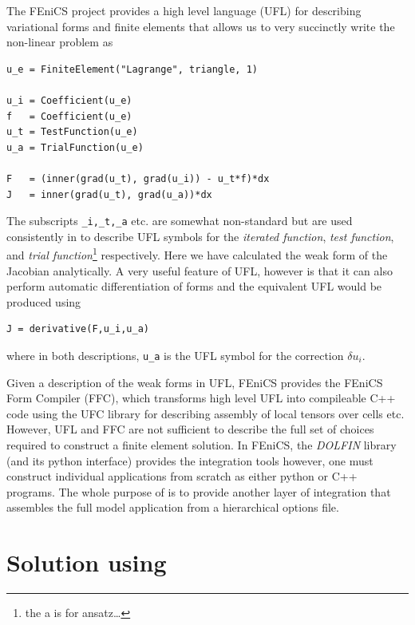 The FEniCS project provides a  high level language (UFL) for describing
variational forms and finite elements that allows us to very succinctly write the
non-linear problem  as 
\begin{lstlisting}[style=UFL]
u_e = FiniteElement("Lagrange", triangle, 1)

u_i = Coefficient(u_e)
f   = Coefficient(u_e)
u_t = TestFunction(u_e)
u_a = TrialFunction(u_e)

F   = (inner(grad(u_t), grad(u_i)) - u_t*f)*dx
J   = inner(grad(u_t), grad(u_a))*dx
\end{lstlisting}
The subscripts \texttt{\_i,\_t,\_a} etc. are somewhat non-standard but
are used consistently in \TF{} to describe UFL symbols for the
\emph{iterated function}, \emph{test function}, and \emph{trial
  function}\footnote{the a is for ansatz\ldots{}} respectively.  Here we have
calculated the weak form of the Jacobian analytically. A very useful
feature of UFL, however is that it can also perform automatic
differentiation of forms and the equivalent UFL would be produced
using
\begin{lstlisting}[style=UFL]
J = derivative(F,u_i,u_a)
\end{lstlisting}
where in both descriptions, \texttt{u\_a} is the UFL symbol for the
correction $\delta u_{i}$.  

Given a description of the weak forms in UFL,  FEniCS provides the
FEniCS Form Compiler (FFC), which transforms high level UFL into
compileable C++ code using the UFC library for describing assembly of
local tensors over cells etc.  However, UFL and FFC are not sufficient
to describe the full set of choices required to construct a finite
element solution.  In FEniCS,  the \emph{DOLFIN} library (and its
python interface) provides the integration tools however, one must
construct individual applications from scratch as either python or C++
programs.  The whole purpose of \TF{} is to provide another layer of
integration that assembles the full model application from a
hierarchical options file. 

\section{Solution using \TF}
\label{sec:ch2-solution-using-tf}


